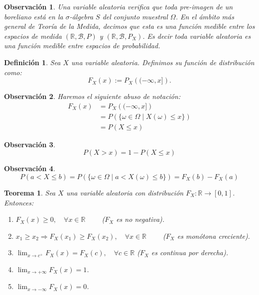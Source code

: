 \documentclass{report}
\newtheorem{thm}{Teorema}[section]
\newtheorem{dfn}{Definición}[section]
\newtheorem{obs}{Observación}[section]
\begin{document}
\begin{obs}
Una variable aleatoria verifica que toda pre-imagen de un boreliano está en la $\sigma$-álgebra $S$ del conjunto muestral $\Omega$. 
En el ámbito más general de Teoría de la Medida, decimos que esta es una función \emph{medible} entre los espacios de medida
$(\mathbb{R}, \mathcal{B}, P)$ y $(\mathbb{R}, \mathcal{B}, P_X)$. Es decir toda variable aleatoria es una función medible entre espacios de probabilidad.
\end{obs}

\begin{dfn}
Sea $X$ una variable aleatoria. Definimos su \emph{función de distribución} como:
$$
    F_X(x) := P_X\left( (-\infty, x] \right).
$$
\end{dfn}

\begin{obs} Haremos el siguiente abuso de notación:
    \begin{equation*}
        \begin{split}
            F_X(x) &= P_X\left( (-\infty, x] \right)\\
            & = P\left( \{\omega \in \Omega \;|\; X(\omega) \leq x\} \right)\\
            & = P(X\leq x)
        \end{split}
    \end{equation*}
\end{obs}

\begin{obs} 
\begin{equation*}
    P(X>x) = 1 - P(X\leq x)
\end{equation*}
\end{obs}

\begin{obs} 
\begin{equation*}
    P(a<X\leq b) =  P\left( \{\omega \in \Omega \;|\; a< X(\omega) \leq b\} \right) = F_X(b)-F_X(a)
\end{equation*}
\end{obs}

\begin{thm}
Sea $X$ una variable aleatoria con distribución $F_X:\mathbb{R}\rightarrow[0,1]$. Entonces:
\begin{enumerate}
\item $F_X(x)\geq 0, \quad \forall x \in \mathbb{R} \qquad$ ($F_X$ es no negativa).
\item $ x_1 \geq x_2 \Rightarrow F_X(x_1)\geq F_X(x_2), \quad \forall x \in \mathbb{R} \qquad$ ($F_X$ es monótona creciente).
\item $\lim_{x\rightarrow c^+}F_X(x) = F_X(c), \quad \forall c \in \mathbb{R}$ ($F_X$ es continua por derecha).
\item $\lim_{x\rightarrow +\infty}F_X(x) = 1 $.
\item $\lim_{x\rightarrow -\infty}F_X(x) = 0 $.
\end{enumerate}
\end{thm}
\end{document}
